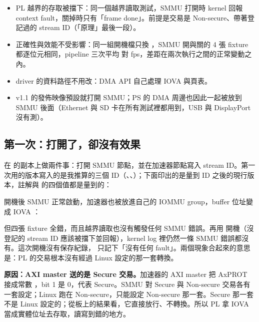 \begin{gain}
\begin{itemize}
\item PL 越界的存取被擋下：同一個越界讀取測試，SMMU 打開時 kernel 回報 context fault，關掉時只有「frame done」。前提是交易是 Non-secure、帶著登記過的 stream ID（「原理」最後一段）。
\item 正確性與效能不受影響：同一組開機檔只換 ，SMMU 開與關的 4 張 fixture 都逐位元相同，pipeline 三次平均 \smmuOnFps{} 對 \smmuOffFps{} fps，差距在兩次執行之間的正常變動之內。
\item driver 的資料路徑不用改：DMA API 自己處理 IOVA 與頁表。
\item v1.1 的發佈映像預設就打開 SMMU；PS 的 DMA 周邊也因此一起被放到 SMMU 後面（Ethernet 與 SD 卡在所有測試裡都用到，USB 與 DisplayPort 沒有測）。
\end{itemize}
\end{gain}

\subsection{第一次：打開了，卻沒有效果}

 在  的副本上做兩件事：打開 SMMU 節點，並在加速器節點寫入 stream ID。第一次用的版本寫入的是我推算的三個 ID（、、）；下面印出的是量到 ID 之後的現行版本，註解與  的四個值都是量到的：


開機後 SMMU 正常啟動，加速器也被放進自己的 IOMMU group，buffer 位址變成 IOVA \mbox{}：


但四張 fixture 全錯，而且越界讀取也沒有觸發任何 SMMU 錯誤。再用  開機（沒登記的 stream ID 應該被擋下並回報），kernel log 裡仍然一條 SMMU 錯誤都沒有。這次開機沒有保存紀錄， 只記下「沒有任何 fault」。兩個現象合起來的意思是：PL 的交易根本沒有經過 Linux 設定的那一套轉換。

\textbf{原因：AXI master 送的是 Secure 交易。}加速器的 AXI master 把 AxPROT 接成常數 ，bit 1 是 0，代表 Secure。SMMU 對 Secure 與 Non-secure 交易各有一套設定；Linux 跑在 Non-secure，只能設定 Non-secure 那一套。Secure 那一套不是 Linux 設定的；從板上的結果看，它直接放行、不轉換。所以 PL 拿 IOVA 當成實體位址去存取，讀寫到錯的地方。

